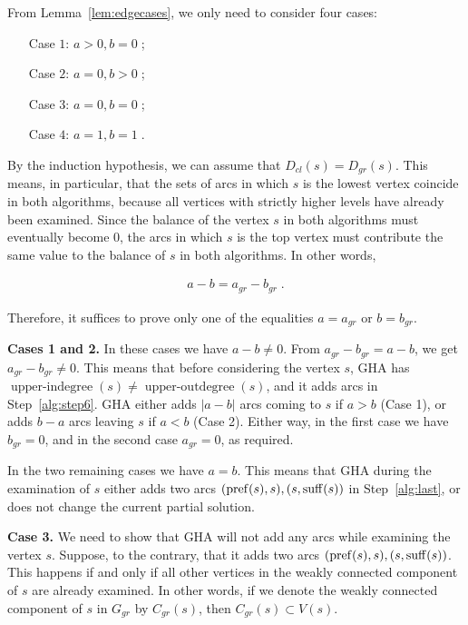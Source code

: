 From Lemma~\ref{lem:edgecases}, we only need to consider four cases:
\begin{enumerate}
\item[Case $1$:] $ a> 0, b = 0\; $;
\item[Case $2$:] $ a = 0, b> 0\; $;
\item[Case $3$:] $ a = 0, b = 0\; $;
\item[Case $4$:] $ a = 1, b = 1\; $.
\end{enumerate}

By the induction hypothesis, we can assume that $ D_{cl} (s) = D_{gr} (s) $. This means, in particular, that the sets of arcs in which $ s $ is the lowest vertex coincide in both algorithms, because all vertices with strictly higher levels have already been examined. Since the balance of the vertex $s$ in both algorithms must eventually become $ 0 $, the arcs in which $ s $ is the top vertex must contribute the same value to the balance of $ s $ in both algorithms. In other words,

\begin{align*}
\label{eqn:balance}
    a-b = a_{gr}-b_{gr} \; .
\end{align*}

Therefore, it suffices to prove only one of the equalities $ a = a_{gr} $ or $ b = b_{gr} $.

\textbf {Cases 1 and 2.} In these cases we have $a-b\ne 0$. From $ a_{gr} - b_{gr} = a-b$, we get $ a_{gr} - b_{gr}\ne 0$. This means that before considering the vertex $s$, GHA has $\operatorname{upper-indegree}(s) \neq \operatorname{upper-outdegree}(s)$, and it adds arcs in Step~\ref{alg:step6}. GHA either adds $|a-b| $ arcs coming to $ s $ if $ a> b $ (Case 1), or adds $ b-a$ arcs leaving $ s $ if $ a <b $ (Case 2). Either way, in the first case we have $ b_{gr} = 0 $, and in the second case $ a_{gr} = 0 $, as required.

In the two remaining cases we have $a=b$. This means that GHA during the examination of $ s $ either adds two arcs $ (\operatorname{pref} (s), s), (s, \operatorname{suff} (s)) $ in Step~\ref{alg:last}, or does not change the current partial solution.

\textbf {Case 3.} We need to show that GHA will not add any arcs while examining the vertex $ s $. Suppose, to the contrary, that it adds two arcs $ (\operatorname{pref} (s), s), (s, \operatorname{suff} (s)) $. This happens if and only if all other vertices in the weakly connected component of $ s $ are already examined. In other words, if we denote the weakly connected component of $ s $ in $ G_{gr} $ by $ C_{gr} (s) $, then $ C_{gr} (s) \subset V (s) $.

